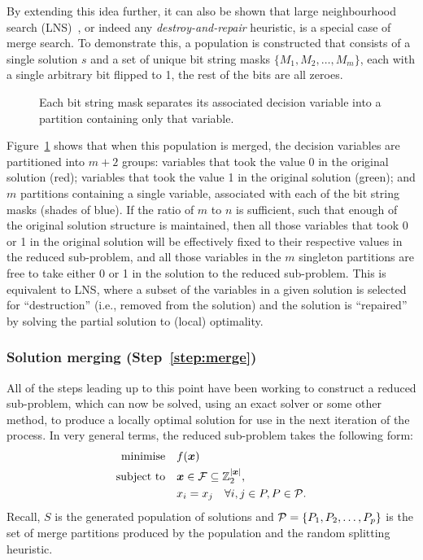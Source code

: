 \documentclass[preprint]{elsarticle}
\begin{document}
By extending this idea further, it can also be shown that large neighbourhood search (LNS)~\citep{lns-book}, or indeed any \emph{destroy-and-repair} heuristic, is a special case of merge search. To demonstrate this, a population is constructed that consists of a single solution $s$ and a set of unique bit string masks $\{M_1,M_2,\dots,M_m\}$, each with a single arbitrary bit flipped to 1, the rest of the bits are all zeroes. 

\begin{figure}[h]
\centering
{}
\caption[Demonstrtation that Merge Search is equivalent to LNS]
       {Each bit string mask separates its associated decision variable into a partition containing only that variable.}
\label{fig:lns-merge}
\end{figure}

Figure~\ref{fig:lns-merge} shows that when this population is merged, the decision variables are partitioned into $m+2$ groups: variables that took the value 0 in the original solution (red); variables that took the value 1 in the original solution (green); and $m$ partitions containing a single variable, associated with each of the bit string masks (shades of blue). If the ratio of $m$ to $n$ is sufficient, such that enough of the original solution structure is maintained, then all those variables that took 0 or 1 in the original solution will be effectively fixed to their respective values in the reduced sub-problem, and all those variables in the $m$ singleton partitions are free to take either 0 or 1 in the solution to the reduced sub-problem. This is equivalent to LNS, where a subset of the variables in a given solution is selected for ``destruction'' (i.e., removed from the solution) and the solution is ``repaired'' by solving the partial solution to (local) optimality. 

\subsubsection*{\textbf{Solution merging (Step~\ref{step:merge})}}
All of the steps leading up to this point have been working to construct a reduced sub-problem, which can now be solved, using an exact solver or some other method, to produce a locally optimal solution for use in the next iteration of the process. In very general terms, the reduced sub-problem takes the following form:
\begin{align}
              \text{minimise} \quad & f(\boldsymbol{x})\label{eq:merge_group}\\
              \text{subject to} \quad  &\boldsymbol{x} \in \mathcal{F} \subseteq \mathbb{Z}_2^{|\boldsymbol{x}|},\nonumber\\
              & x_i = x_j \quad \forall i,j \in P, P \in {\cal P}.\nonumber
\end{align}
Recall, $S$ is the generated population of solutions and ${\cal P} = \{P_1,P_2,\dots,P_p\}$ is the set of merge partitions produced by the population and the random splitting heuristic.
\end{document}
